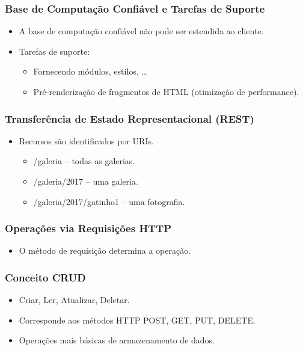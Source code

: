 \documentclass{beamer}
\begin{document}
\begin{frame}
      \frametitle{Base de Computação Confiável e Tarefas de Suporte}
      \begin{itemize}
            \item A base de computação confiável não pode ser estendida ao cliente.
            \item Tarefas de suporte:
                  \begin{itemize}
                        \item Fornecendo módulos, estilos, …
                        \item Pré-renderização de fragmentos de HTML (otimização de performance).
                  \end{itemize}
      \end{itemize}
\end{frame}
\begin{frame}
      \frametitle{Transferência de Estado Representacional (REST)}
      \begin{itemize}
            \item Recursos são identificados por URIs.
                  \begin{itemize}
                        \item /galeria – todas as galerias.
                        \item /galeria/2017 – uma galeria.
                        \item /galeria/2017/gatinho1 – uma fotografia.
                  \end{itemize}
      \end{itemize}
\end{frame}

\begin{frame}
      \frametitle{Operações via Requisições HTTP}
      \begin{itemize}
            \item O método de requisição determina a operação.
      \end{itemize}
\end{frame}

\begin{frame}
      \frametitle{Conceito CRUD}
      \begin{itemize}
            \item Criar, Ler, Atualizar, Deletar.
            \item Corresponde aos métodos HTTP POST, GET, PUT, DELETE.
            \item Operações mais básicas de armazenamento de dados.
      \end{itemize}
\end{frame}
\end{document}
